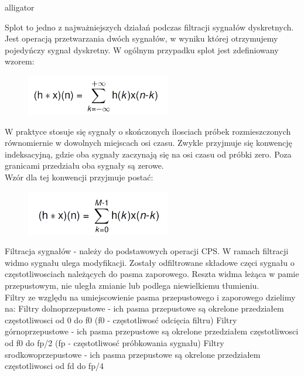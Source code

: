 \documentclass[12pt]{article}
\begin{document}
\begin{labeling}{alligator}


\item [Splot] to jedno z najważniejszych działań podczas filtracji sygnałów dyskretnych. Jest operacją przetwarzania dwóch sygnałów, w wyniku której otrzymujemy pojedyńczy sygnał dyskretny.  W ogólnym przypadku splot jest zdefiniowany wzorem:
\begin{figure}[h!]
 \centering
 \includegraphics[width=6.3cm]{splotWO.PNG}
 \vspace{-0.3cm}
 \label{Widok_aplikacjis}
\end{figure}
W praktyce stosuje się sygnały o skończonych ilosciach próbek rozmieszczonych równomiernie w dowolnych miejscach osi czasu. Zwykle przyjmuje się konwencję indeksacyjną, gdzie oba sygnały zaczynają się  na osi czasu od próbki zero. Poza granicami przedziału oba sygnały są zerowe. 
\\Wzór dla tej konwencji przyjmuje postać: 
\begin{figure}[h!]
 \centering
 \includegraphics[width=6.3cm]{splotWS.PNG}
 \vspace{-0.3cm}
 \label{Splot_indeks}
\end{figure}


\item [Filtracja sygnałów]  - należy do podstawowych operacji CPS. W ramach filtracji widmo sygnału ulega modyfikacji. Zostały odfiltrowane składowe częci sygnału o częstotliwosciach należących do pasma zaporowego. Reszta widma leżąca w pamie przepustowym, nie uległa zmianie lub podlega niewielkiemu tłumieniu. 
\\Filtry ze względu na umiejscowienie pasma przepustowego i zaporowego dzielimy na:
\subitem Filtry dolnoprzepustowe - ich pasma przepustowe są okrelone przedziałem częstotliwosci od 0 do f0 (f0 - częstotliwosć odcięcia filtru) 
\subitem Filtry górnoprzepustowe - ich pasma przepustowe są okrelone przedziałem częstotliwosci od f0 do fp/2 (fp - częstotliwosć próbkowania sygnału) 
\subitem Filtry srodkowoprzepustowe - ich pasma przepustowe są okrelone przedziałem częstotliwosci od fd do fp/4 


\end{labeling}
\end{document}
